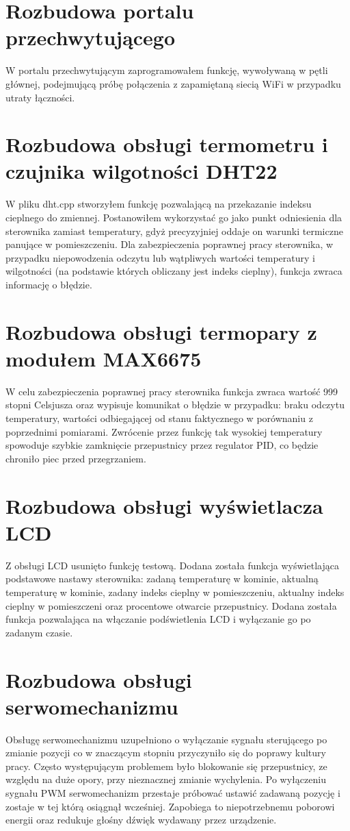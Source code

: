 \documentclass[11pt]{report}
\begin{document}
  \section{Rozbudowa portalu przechwytującego}
  W portalu przechwytującym zaprogramowałem funkcję, wywoływaną w pętli głównej, podejmującą próbę połączenia z zapamiętaną siecią WiFi w przypadku utraty łączności.
  
 \section{Rozbudowa obsługi termometru i czujnika wilgotności DHT22}
W pliku dht.cpp stworzyłem funkcję pozwalającą na przekazanie indeksu cieplnego do zmiennej. Postanowiłem wykorzystać go jako punkt odniesienia dla sterownika zamiast temperatury, gdyż precyzyjniej oddaje on warunki termiczne panujące w pomieszczeniu. Dla zabezpieczenia poprawnej pracy sterownika, w przypadku niepowodzenia odczytu lub wątpliwych wartości temperatury i wilgotności (na podstawie których obliczany jest indeks cieplny), funkcja zwraca informację o błędzie.

 \section{Rozbudowa obsługi termopary z modułem MAX6675}
 W celu zabezpieczenia poprawnej pracy sterownika funkcja zwraca wartość 999 stopni Celsjusza oraz wypisuje komunikat o błędzie w przypadku: braku odczytu temperatury, wartości odbiegającej od stanu faktycznego w porównaniu z poprzednimi pomiarami. Zwrócenie przez funkcję tak wysokiej temperatury spowoduje szybkie zamknięcie przepustnicy przez regulator PID, co będzie chroniło piec przed przegrzaniem.
 
 \section{Rozbudowa obsługi wyświetlacza LCD}
 Z obsługi LCD usunięto funkcję testową. Dodana została funkcja wyświetlająca podstawowe nastawy sterownika: zadaną temperaturę w kominie, aktualną temperaturę w kominie, zadany indeks cieplny w pomieszczeniu, aktualny indeks cieplny w pomieszczeni oraz procentowe otwarcie przepustnicy. Dodana została funkcja pozwalająca na włączanie podświetlenia LCD i wyłączanie go po zadanym czasie.

 \section{Rozbudowa obsługi serwomechanizmu}
 Obsługę serwomechanizmu uzupełniono o wyłączanie sygnału sterującego po zmianie pozycji co w znaczącym stopniu przyczyniło się do poprawy kultury pracy. Często występującym problemem było blokowanie się przepustnicy, ze względu na duże opory, przy nieznacznej zmianie wychylenia. Po wyłączeniu sygnału PWM serwomechanizm przestaje próbować ustawić zadawaną pozycję i zostaje w tej którą osiągnął wcześniej. Zapobiega to niepotrzebnemu poborowi energii oraz redukuje głośny dźwięk wydawany przez urządzenie.
\end{document}
